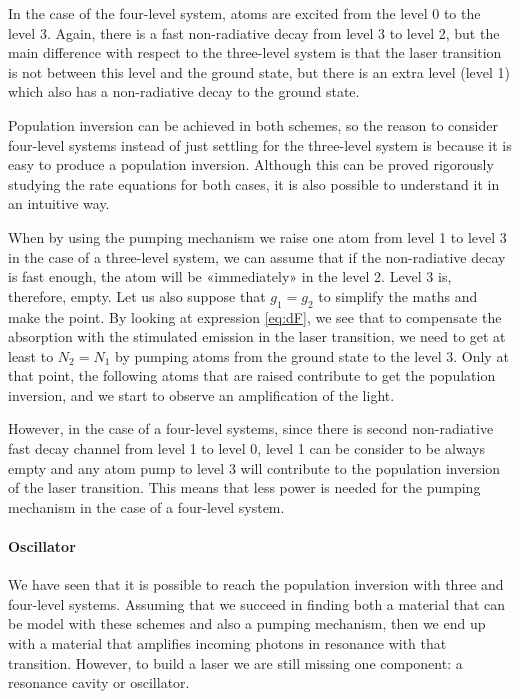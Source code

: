 \documentclass[11pt,a4paper]{article}
\begin{document}
In the case of the four-level system, atoms are excited from the level 0 to the level 3. Again, there is a fast non-radiative decay from level 3 to level 2, but the main difference with respect to the three-level system is that the laser transition is not between this level and the ground state, but there is an extra level (level 1) which also has a non-radiative decay to the ground state.

Population inversion can be achieved in both schemes, so the reason to consider four-level systems instead of just settling for the three-level system is because it is easy to produce a population inversion. Although this can be proved rigorously studying the rate equations for both cases, it is also possible to understand it in an intuitive way.

When by using the pumping mechanism we raise one atom from level 1 to level 3 in the case of a three-level system, we can assume that if the non-radiative decay is fast enough, the atom will be «immediately» in the level 2. Level 3 is, therefore, empty. Let us also suppose that $g_1=g_2$ to simplify the maths and make the point. By looking at expression \eqref{eq:dF}, we see that to compensate the absorption with the stimulated emission in the laser transition, we need to get at least to $N_2=N_1$ by pumping atoms from the ground state to the level 3. Only at that point, the following atoms that are raised contribute to get the population inversion, and we start to observe an amplification of the light.

However, in the case of a four-level systems, since there is second non-radiative fast decay channel from level 1 to level 0, level 1 can be consider to be always empty and any atom pump to level 3 will contribute to the population inversion of the laser transition. This means that less power is needed for the pumping mechanism in the case of a four-level system.

\paragraph{Oscillator}
We have seen that it is possible to reach the population inversion with three and four-level systems. Assuming that we succeed in finding both a material that can be model with these schemes and also a pumping mechanism, then we end up with a material that amplifies incoming photons in resonance with that transition. However, to build a laser we are still missing one component: a resonance cavity or oscillator.
\end{document}
